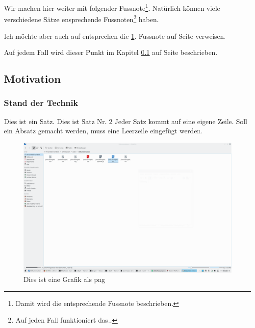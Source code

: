 \documentclass[a4paper,12pt]{article}
\begin{document}
Wir machen hier weiter mit folgender Fussnote\footnote{\label{foot:nonce1}Damit wird die entsprechende Fussnote beschrieben.}.
Natürlich können viele verschiedene Sätze ensprechende Fussnoten\footnote{\label{foot:nonce2}Auf jeden Fall funktioniert das..} haben.

Ich möchte aber auch auf entsprechen die \ref{foot:nonce1}. Fussnote auf Seite \pageref{foot:nonce1} verweisen.

Auf jedem Fall wird dieser Punkt im Kapitel \ref{subsec:Motivation} auf Seite \pageref{sec:Einleitung} beschrieben.

\subsection{Motivation}
\label{subsec:Motivation}
\subsubsection{Stand der Technik}
\label{subsubsec:Stand der Technik}
Dies ist ein Satz.
Dies ist Satz Nr. 2
Jeder Satz kommt auf eine eigene Zeile.
Soll ein Absatz gemacht werden, muss eine Leerzeile eingefügt werden.
\begin{figure}
	\centering
	\includegraphics[scale=0.25]{BilderEinleitung/bild.pdf}
	\caption{Dies ist eine Grafik als png}
	\label{img:grafik-dummy1}
\end{figure}
\end{document}
